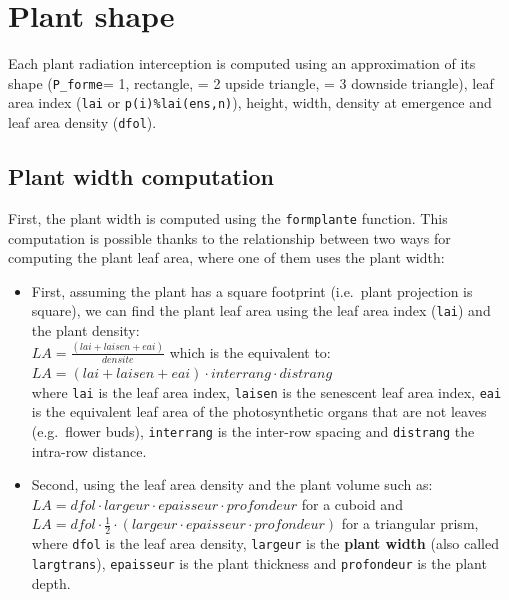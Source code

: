 \documentclass[
]{book}
\begin{document}
\hypertarget{plant-shape}{%
\section{Plant shape}\label{plant-shape}}

Each plant radiation interception is computed using an approximation of its shape (\texttt{P\_forme}= 1, rectangle, = 2 upside triangle, = 3 downside triangle), leaf area index (\texttt{lai} or \texttt{p(i)\%lai(ens,n)}), height, width, density at emergence and leaf area density (\texttt{dfol}).

\hypertarget{plant-width-computation}{%
\subsection{Plant width computation}\label{plant-width-computation}}

First, the plant width is computed using the \texttt{formplante} function. This computation is possible thanks to the relationship between two ways for computing the plant leaf area, where one of them uses the plant width:

\begin{itemize}
\item
  First, assuming the plant has a square footprint (i.e.~plant projection is square), we can find the plant leaf area using the leaf area index (\texttt{lai}) and the plant density:\\
  \(LA=\frac{\left(lai+laisen+eai\right)}{densite}\) which is the equivalent to: \(LA=\left(lai+laisen+eai\right)\cdot interrang\cdot distrang\)\\
  where \texttt{lai} is the leaf area index, \texttt{laisen} is the senescent leaf area index, \texttt{eai} is the equivalent leaf area of the photosynthetic organs that are not leaves (e.g.~flower buds), \texttt{interrang} is the inter-row spacing and \texttt{distrang} the intra-row distance.
\item
  Second, using the leaf area density and the plant volume such as:\\
  \(LA=dfol\cdot largeur\cdot epaisseur\cdot profondeur\) for a cuboid and \(LA=dfol\cdot\frac{1}{2}\cdot\left(largeur\cdot epaisseur\cdot profondeur\right)\) for a triangular prism, where \texttt{dfol} is the leaf area density, \texttt{largeur} is the \textbf{plant width} (also called \texttt{largtrans}), \texttt{epaisseur} is the plant thickness and \texttt{profondeur} is the plant depth.
\end{itemize}
\end{document}
